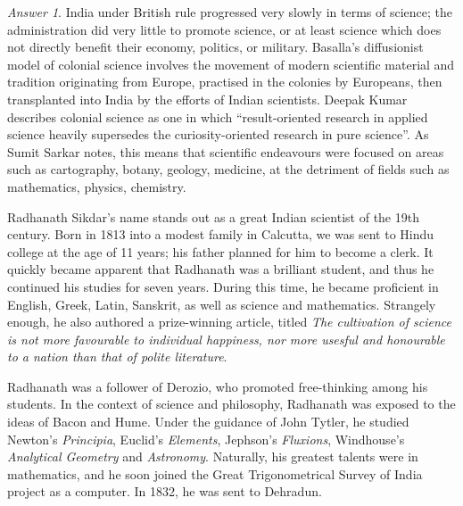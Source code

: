 \documentclass[11pt]{article}
\theoremstyle{remark}
\newtheorem*{answer}{Answer}
\begin{document}
    \begin{answer}
        India under British rule progressed very slowly in terms of science; the
        administration did very little to promote science, or at least science which
        does not directly benefit their economy, politics, or military. Basalla's
        diffusionist model of colonial science involves the movement of modern
        scientific material and tradition originating from Europe, practised in the
        colonies by Europeans, then transplanted into India by the efforts of Indian
        scientists. Deepak Kumar describes colonial science as one in which
        ``result-oriented research in applied science heavily supersedes the
        curiosity-oriented research in pure science''. As Sumit Sarkar notes, this
        means that scientific endeavours were focused on areas such as cartography,
        botany, geology, medicine, at the detriment of fields such as mathematics,
        physics, chemistry.

        Radhanath Sikdar's name stands out as a great Indian scientist of the 19th
        century. Born in 1813 into a modest family in Calcutta, we was sent to Hindu
        college at the age of 11 years; his father planned for him to become a clerk.
        It quickly became apparent that Radhanath was a brilliant student, and thus
        he continued his studies for seven years. During this time, he became
        proficient in English, Greek, Latin, Sanskrit, as well as science and
        mathematics.  Strangely enough, he also authored a prize-winning article,
        titled \emph{The cultivation of science is not more favourable to individual
        happiness, nor more usesful and honourable to a nation than that of polite
        literature}.

        Radhanath was a follower of Derozio, who promoted free-thinking among his
        students. In the context of science and philosophy, Radhanath was exposed to
        the ideas of Bacon and Hume. Under the guidance of John Tytler, he studied
        Newton's \emph{Principia}, Euclid's \emph{Elements}, Jephson's
        \emph{Fluxions}, Windhouse's \emph{Analytical Geometry} and \emph{Astronomy}.
        Naturally, his greatest talents were in mathematics, and he soon joined the
        Great Trigonometrical Survey of India project as a computer. In 1832, he was
        sent to Dehradun.


\end{answer}
\end{document}
